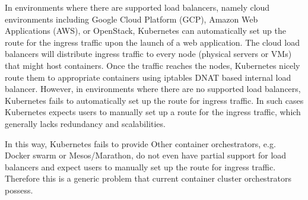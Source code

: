 In environments where there are supported load balancers, namely cloud environments including Google Cloud Platform (GCP), Amazon Web Applications (AWS), or OpenStack, Kubernetes can automatically set up the route for the ingress traffic upon the launch of a web application.
The cloud load balancers will distribute ingress traffic to every node (physical servers or VMs) that might host containers.
Once the traffic reaches the nodes, Kubernetes nicely route them to appropriate containers using iptables DNAT based internal load balancer.
%
However, in environments where there are no supported load balancers, Kubernetes fails to automatically set up the route for ingress traffic.
In such cases Kubernetes expects users to manually set up a route for the ingress traffic, which generally lacks redundancy and scalabilities.

In this way, Kubernetes fails to provide 
Other container orchestrators, e.g. Docker swarm or Mesos/Marathon, do not even have partial support for load balancers and expect users to manually set up the route for ingress traffic.
Therefore this is a generic problem that current container cluster orchestrators possess.

\section{}

\subsection{}


